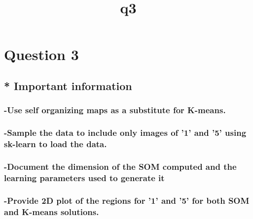 \documentclass[11pt]{article}
\title{q3}
\begin{document}
    
    
    \maketitle
    
    

    
    \section{Question 3}\label{question-3}

\subsection{* Important information}\label{important-information}

\subsubsection{\texorpdfstring{-{Use self organizing maps as a
substitute for K-means.
}}{-Use self organizing maps as a substitute for K-means. }}\label{use-self-organizing-maps-as-a-substitute-for-k-means.}

\subsubsection{\texorpdfstring{-{Sample the data to include only images
of '1' and '5' using sk-learn to load the
data.}}{-Sample the data to include only images of '1' and '5' using sk-learn to load the data.}}\label{sample-the-data-to-include-only-images-of-1-and-5-using-sk-learn-to-load-the-data.}

\subsubsection{\texorpdfstring{-{Document the dimension of the SOM
computed and the learning parameters used to generate
it}}{-Document the dimension of the SOM computed and the learning parameters used to generate it}}\label{document-the-dimension-of-the-som-computed-and-the-learning-parameters-used-to-generate-it}

\subsubsection{\texorpdfstring{-{Provide 2D plot of the regions for '1'
and '5' for both SOM and K-means
solutions.}}{-Provide 2D plot of the regions for '1' and '5' for both SOM and K-means solutions.}}\label{provide-2d-plot-of-the-regions-for-1-and-5-for-both-som-and-k-means-solutions.}
\end{document}
